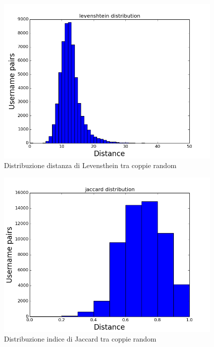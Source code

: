 \begin{figure}[bp!]
\centering
\includegraphics[width=110mm]{chapters/distanceplot/random_levenshtein_distribution.png}
\caption{Distribuzione distanza di Levensthein tra coppie random  \label{overflow}}
\end{figure}

\begin{figure}[bp!]
\centering
\includegraphics[width=110mm]{chapters/distanceplot/random_jaccard_distribution.png}
\caption{Distribuzione indice di Jaccard tra coppie random \label{overflow}}
\end{figure}
